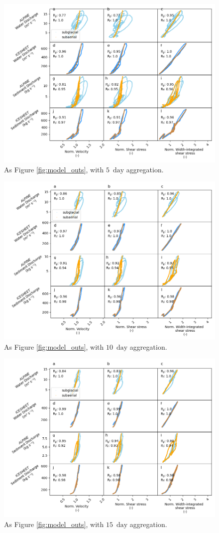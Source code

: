 \documentclass[draft]{agujournal2019}
\newcommand{\unit}[1]{$\mathrm{#1}$}
\begin{document}
\begin{center}
  \begin{figure}[!h]
    \includegraphics[width=0.7\linewidth]{Fig3_5day.png}
    \caption{As Figure \ref{fig:model_outs}, with $5$ \,\unit{day} aggregation.}
    \label{fig:model_outs_5day}
  \end{figure}
\end{center}

\begin{center}
  \begin{figure}[!h]
    \includegraphics[width=0.7\linewidth]{Fig3_10day.png}
    \caption{As Figure \ref{fig:model_outs}, with $10$ \,\unit{day} aggregation.}
    \label{fig:model_outs_10day}
  \end{figure}
\end{center}

\begin{center}
  \begin{figure}[!h]
    \includegraphics[width=0.7\linewidth]{Fig3_15day.png}
    \caption{As Figure \ref{fig:model_outs}, with $15$ \,\unit{day} aggregation.}
    \label{fig:model_outs_15day}
  \end{figure}
\end{center}
\FloatBarrier
\end{document}
